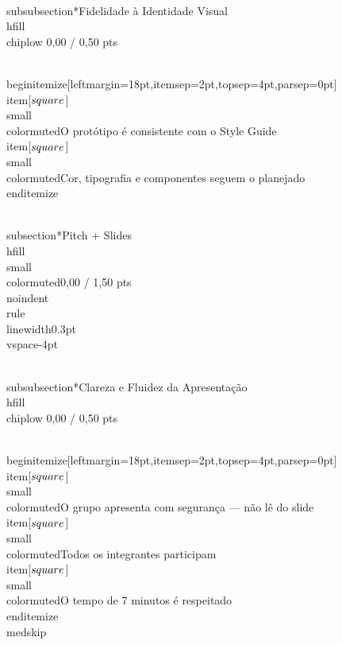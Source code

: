 \documentclass[11pt, a4paper]{article}
\newcommand{\chiplow}[1]{\colorbox{crimsondim}{\color{crimson}\semibold\small\strut\ #1\ }}
\begin{document}
\\subsubsection*{Fidelidade à Identidade Visual \\hfill {\\chiplow 0,00 / 0,50 pts}}

\\begin{itemize}[leftmargin=18pt,itemsep=2pt,topsep=4pt,parsep=0pt]
  \\item[$\\square$] {\\small\\color{muted}O protótipo é consistente com o Style Guide}
  \\item[$\\square$] {\\small\\color{muted}Cor, tipografia e componentes seguem o planejado}
\\end{itemize}

\\subsection*{Pitch + Slides \\hfill {\\small\\color{muted}0,00 / 1,50 pts}}
\\noindent\\rule{\\linewidth}{0.3pt}\\vspace{-4pt}

\\subsubsection*{Clareza e Fluidez da Apresentação \\hfill {\\chiplow 0,00 / 0,50 pts}}

\\begin{itemize}[leftmargin=18pt,itemsep=2pt,topsep=4pt,parsep=0pt]
  \\item[$\\square$] {\\small\\color{muted}O grupo apresenta com segurança — não lê do slide}
  \\item[$\\square$] {\\small\\color{muted}Todos os integrantes participam}
  \\item[$\\square$] {\\small\\color{muted}O tempo de 7 minutos é respeitado}
\\end{itemize}
\\medskip
\end{document}
